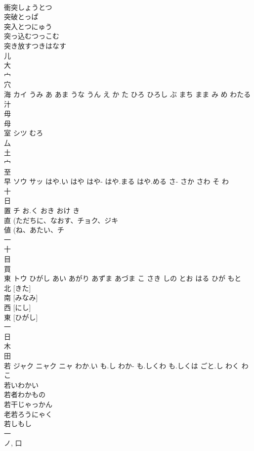 \documentclass[8pt]{extreport}
\begin{document}
\begin{CJK}{UTF8}{min}
\\	衝突しょうとつ 
\\	突破とっぱ 
\\	突入とつにゅう 
\\	突っ込むつっこむ 
\\	突き放すつきはなす 
\\	儿 
\\	大 
\\	宀 
\\	穴 
\\	海	カイ	うみ あ あま うな うん え か た ひろ ひろし ぶ まち まま み め わたる	
\\	汁 
\\	毋 
\\	母 
\\	室	シツ	むろ	
\\	厶 
\\	土 
\\	宀 
\\	至 
\\	早	ソウ サッ	はや.い はや はや- はや.まる はや.める さ- さか さわ そ わ	
\\	十 
\\	日 
\\	置	チ	お.く おき おけ き	
\\	直 (ただちに、なおす、チョク、ジキ 
\\	値 (ね、あたい、チ 
\\	一 
\\	十 
\\	目 
\\	買 
\\	東	トウ	ひがし あい あがり あずま あづま こ さき しの とお はる ひが もと	
\\	北 [きた] 
\\	南 [みなみ] 
\\	西 [にし] 
\\	東 [ひがし] 
\\	一 
\\	日 
\\	木 
\\	田 
\\	若	ジャク ニャク ニャ	わか.い も.し わか- も.しくわ も.しくは ごと.し わく わこ	
\\	若いわかい
\\	若者わかもの
\\	若干じゃっかん
\\	老若ろうにゃく
\\	若しもし
\\	一 
\\	ノ, 口 

\end{CJK}
\end{document}
